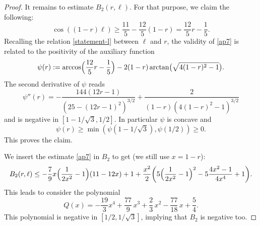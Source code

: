 \documentclass[JEP,XML,SOM,Unicode,NoFloatCountersInSection]{cedram}
\theoremstyle{plain}
\theoremstyle{definition}
\begin{document}
\begin{proof}
It remains to estimate $B_2(r,\ell)$. For that purpose, we claim the following:
\begin{equation}\label{ap7}
\cos((1-r)\ell) \geq \frac{11}{5} - \frac{12}{5}(1-r) = \frac{12}{5} r - \frac{1}{5}.
\end{equation}
Recalling the relation \eqref{statement-l} between $\ell$ and $r$, the validity of \eqref{ap7} is related to the positivity of the auxiliary function\vspace*{-2pt}
\[
\psi(r):=\arccos\Bigl(\frac{12}{5} r - \frac{1}{5}\Bigr)-
2(1-r)\arctan\bigl(\sqrt{4(1-r)^2-1}\bigr).
\]
The second derivative of $\psi$ reads\vspace*{-2pt}
\[
\psi''(r)=-\frac{144(12 r-1)}{\left( 25-(12 r -1)^2\right)^{3/2}} + \frac{2}{(1-r)(4(1-r)^2-1)^{3/2}}
\]
and is negative in $[1-1/\sqrt{3},1/2]$. In particular $\psi$ is concave and\vspace*{-3pt}
\[
\psi(r)\geq \min (\psi(1-1/\sqrt{3}),\psi(1/2))\geq 0.
\]
This proves the claim.

We insert the estimate \eqref{ap7} in $B_2$ to get (we still use $x=1-r$):
\[
B_2(r,\ell) \leq -\frac{7}{9}x\Bigl(\frac{1}{2x^2}-1\Bigr)(11-12x)+1+\frac{x^2}{2}
\biggl( 5\Bigl(\frac{1}{2x^2}-1\Bigr)^2-5\frac{4x^2-1}{4x^4} +1\biggr).
\]
This leads to consider the polynomial
\[
Q(x)=-\frac{19}{3}x^4+\frac{77}{9}\,x^3+\frac{2}{3}\,x^2-\frac{77}{18}\,x+\frac{5}{4}.
\]
This polynomial is negative in $[1/2,1/\sqrt{3}]$, implying that $B_2$ is negative too.
\end{proof}
\end{document}
